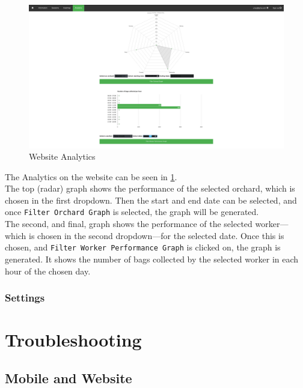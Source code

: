 \documentclass[11pt]{article}
\begin{document}
\begin{figure}
 \centering
 \includegraphics[width=12cm, keepaspectratio]{Images/webAnal.png}
 \caption{Website Analytics}
 \label{webAnalImg}
\end{figure}

The Analytics on the website can be seen in \ref{webAnalImg}. \\
The top (radar) graph shows the performance of the selected orchard, which is chosen in the first dropdown. Then the start and end date can be selected, and once \texttt{Filter Orchard Graph} is selected, the graph will be generated.\\
The second, and final, graph shows the performance of the selected worker---which is chosen in the second dropdown---for the selected date. Once this is chosen, and \texttt{Filter Worker Performance Graph} is clicked on, the graph is generated. It shows the number of bags collected by the selected worker in each hour of the chosen day.

\subsubsection{Settings}
\label{webSettings}


\newpage
\section{Troubleshooting}

\subsection{Mobile and Website}
\end{document}
